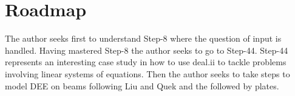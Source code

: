 \documentclass{article}
\begin{document}
\section{Roadmap}
The author seeks first to understand Step-8 where the question of input is handled. Having mastered Step-8 the author seeks to go to Step-44. Step-44 represents an interesting case study in how to use deal.ii to tackle problems involving linear systems of equations. Then the author seeks to take steps to model DEE on beams following Liu and Quek and the followed by plates. 
\end{document}
